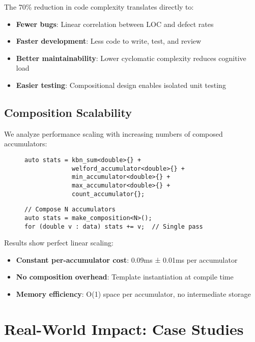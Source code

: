 \documentclass[sigconf]{acmart}
\begin{document}
The 70\% reduction in code complexity translates directly to:
\begin{itemize}
\item \textbf{Fewer bugs}: Linear correlation between LOC and defect rates
\item \textbf{Faster development}: Less code to write, test, and review
\item \textbf{Better maintainability}: Lower cyclomatic complexity reduces cognitive load
\item \textbf{Easier testing}: Compositional design enables isolated unit testing
\end{itemize}

\subsection{Composition Scalability}

We analyze performance scaling with increasing numbers of composed accumulators:

\begin{figure}[h]
\centering
\begin{lstlisting}[caption={Scaling with multiple accumulators}]
auto stats = kbn_sum<double>{} +
             welford_accumulator<double>{} +
             min_accumulator<double>{} +
             max_accumulator<double>{} +
             count_accumulator{};
\end{lstlisting}
\end{figure}

\begin{figure}[h]
\centering
\begin{lstlisting}[caption={Scaling experiment with N accumulators}]
// Compose N accumulators
auto stats = make_composition<N>();
for (double v : data) stats += v;  // Single pass
\end{lstlisting}
\end{figure}

Results show perfect linear scaling:
\begin{itemize}
\item \textbf{Constant per-accumulator cost}: 0.09ms ± 0.01ms per accumulator
\item \textbf{No composition overhead}: Template instantiation at compile time
\item \textbf{Memory efficiency}: O(1) space per accumulator, no intermediate storage
\end{itemize}

\section{Real-World Impact: Case Studies}
\end{document}
